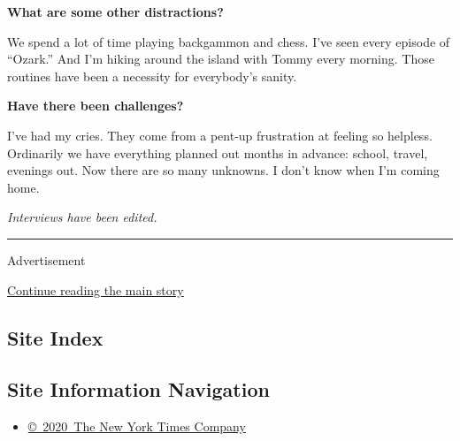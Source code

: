 \textbf{What are some other distractions?}

We spend a lot of time playing backgammon and chess. I've seen every
episode of ``Ozark.'' And I'm hiking around the island with Tommy every
morning. Those routines have been a necessity for everybody's sanity.

\textbf{Have there been challenges?}

I've had my cries. They come from a pent-up frustration at feeling so
helpless. Ordinarily we have everything planned out months in advance:
school, travel, evenings out. Now there are so many unknowns. I don't
know when I'm coming home.

\emph{Interviews have been edited.}

\begin{center}\rule{0.5\linewidth}{\linethickness}\end{center}

Advertisement

\protect\hyperlink{after-bottom}{Continue reading the main story}

\hypertarget{site-index}{%
\subsection{Site Index}\label{site-index}}

\hypertarget{site-information-navigation}{%
\subsection{Site Information
Navigation}\label{site-information-navigation}}

\begin{itemize}
\tightlist
\item
  \href{https://help.nytimes3xbfgragh.onion/hc/en-us/articles/115014792127-Copyright-notice}{©~2020~The
  New York Times Company}
\end{itemize}

